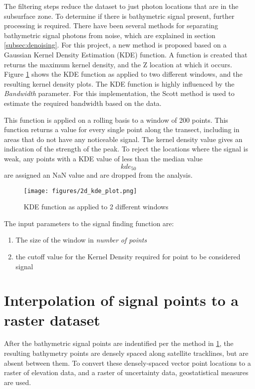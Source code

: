 The filtering steps reduce the dataset to just photon locations that are in the subsurface zone. To determine if there is bathymetric signal present, further processing is required. There have been several methods for separating bathymetric signal photons from noise, which are explained in section \ref{subsec:denoising}. For this project, a new method is proposed based on a Gaussian Kernel Density Estimation (KDE) function. A function is created that returns the maximum kernel density, and the Z location at which it occurs. Figure \ref{fig:kdefunc} shows the KDE function as applied to two different windows, and the resulting kernel density plots. The KDE function is highly influenced by the \emph{Bandwidth} parameter. For this implementation, the Scott method \parencite{Scott2015} is used to estimate the required bandwidth based on the data. 

This function is applied on a rolling basis to a window of 200 points. This function returns a value for every single point along the transect, including in areas that do not have any noticeable signal. The kernel density value gives an indication of the strength of the peak. To reject the locations where the signal is weak, any points with a KDE value of less than the median value $$ kde_{50} $$  are assigned an NaN value and are dropped from the analysis.

\begin{figure}[htbp]
    \centering
    \texttt{[image: figures/2d\_kde\_plot.png]}
    \caption{KDE function as applied to 2 different windows}
    \label{fig:kdefunc}
\end{figure}

The input parameters to the signal finding function are:

\begin{enumerate}
    \item The size of the window in \emph{number of points}
    \item the cutoff value for the Kernel Density required for point to be considered signal
\end{enumerate}

\section{Interpolation of signal points to a raster dataset}

After the bathymetric signal points are indentified per the method in \ref{}, the resulting bathymetry points are densely spaced along satellite tracklines, but are absent between them. To convert these densely-spaced vector point locations to a raster of elevation data, and a raster of uncertainty data, geostatistical measures are used.


